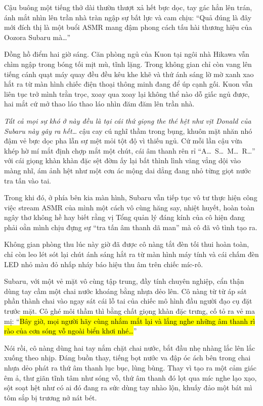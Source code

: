 \documentclass[../main.tex]{subfiles}
\begin{document}
Cậu buông một tiếng thở dài thườn thượt xả hết bực dọc, tay gác hẳn lên trán, ánh mắt nhìn lên trần nhà tràn ngập sự bất lực và cam chịu: ``Quả đúng là đây mới đích thị là một buổi ASMR mang đậm phong cách tấu hài thương hiệu của Oozora Subaru mà\dots''

\ct

Đồng hồ điểm hai giờ sáng. Căn phòng ngủ của Kuon tại ngôi nhà Hikawa vẫn chìm ngập trong bóng tối mịt mù, tĩnh lặng. Trong không gian chỉ còn vang lên tiếng cánh quạt máy quay đều đều kêu khe khẽ và thứ ánh sáng lờ mờ xanh xao hắt ra từ màn hình chiếc điện thoại thông minh đang để úp cạnh gối. Kuon vẫn liên tục trở mình trằn trọc, xoay qua xoay lại không thể nào dỗ giấc ngủ được, hai mắt cứ mở thao láo thao láo nhìn đăm đăm lên trần nhà.

\textit{Tất cả mọi sự khó ở này đều là tại cái thứ giọng the thé hệt như vịt Donald của Subaru này gây ra hết\dots} cậu cay cú nghĩ thầm trong bụng, khuôn mặt nhăn nhó đậm vẻ bực dọc pha lẫn sự mệt mỏi tột độ vì thiếu ngủ. Cứ mỗi lần cậu vừa khép hờ mí mắt định chợp mắt một chút, cái âm thanh rên rỉ ``A\dots\ S\dots\ M\dots\ R\dots'' với cái giọng khàn khàn đặc sệt đờm ấy lại bất thình lình văng vẳng dội vào màng nhĩ, ám ảnh hệt như một cơn ác mộng dai dẳng đang nhỏ từng giọt nước tra tấn vào tai.

Trong khi đó, ở phía bên kia màn hình, Subaru vẫn tiếp tục vô tư thực hiện công việc stream ASMR của mình một cách vô cùng hăng say, nhiệt huyết, hoàn toàn ngây thơ không hề hay biết rằng vị Tổng quản lý đáng kính của cô hiện đang phải oằn mình chịu đựng sự ``tra tấn âm thanh dã man'' mà cô đã vô tình tạo ra.

\il

Không gian phòng thu lúc này giờ đã được cô nàng tắt đèn tối thui hoàn toàn, chỉ còn leo lét sót lại chút ánh sáng hắt ra từ màn hình máy tính và cái chấm đèn LED nhỏ màu đỏ nhấp nháy báo hiệu thu âm trên chiếc míc-rô.

Subaru, với một vẻ mặt vô cùng tập trung, đầy tính chuyên nghiệp, cẩn thận dùng tay cầm một chai nước khoáng bằng nhựa dẻo lên. Cô nàng từ từ áp sát phần thành chai vào ngay sát cái lỗ tai của chiếc mô hình đầu người đạo cụ đặt trước mặt. Cô ghé môi thầm thì bằng chất giọng khàn đặc trưng, cố tỏ ra vẻ ma mị: ``\hl{Bây giờ, mọi người hãy cùng nhắm mắt lại và lắng nghe những âm thanh rì rào của cơn sóng vỗ ngoài biển khơi nhé\dots}''

Nói rồi, cô nàng dùng hai tay nắm chặt chai nước, bắt đầu nhẹ nhàng lắc lên lắc xuống theo nhịp. Đáng buồn thay, tiếng bọt nước va đập óc ách bên trong chai nhựa dẻo phát ra thứ âm thanh lục bục, lùng bùng. Thay vì tạo ra một cảm giác êm ả, thư giãn tĩnh tâm như sóng vỗ, thứ âm thanh đó lọt qua míc nghe lạo xạo, sột soạt hệt như có ai đó đang ra sức dùng tay nhào lộn, khuấy đảo một bát mì tôm sắp bị trương nở nát bét.
\end{document}
